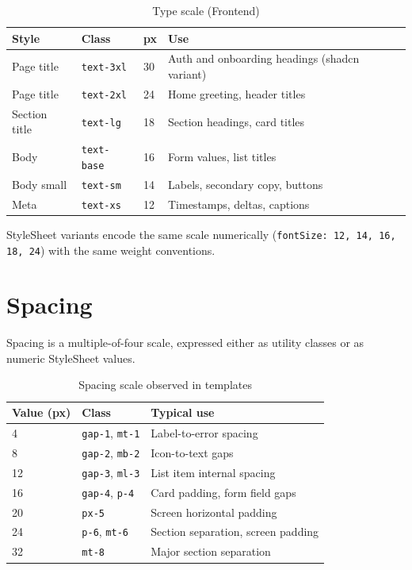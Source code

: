 \begin{table}[H]
\centering
\caption{Type scale (Frontend)}
\begin{tabular}{p{3.2cm}p{2.2cm}p{2.2cm}p{6.2cm}}
\toprule
\textbf{Style} & \textbf{Class} & \textbf{px} & \textbf{Use} \\
\midrule
Page title & \texttt{text-3xl} & 30 & Auth and onboarding headings (shadcn variant) \\
Page title & \texttt{text-2xl} & 24 & Home greeting, header titles \\
Section title & \texttt{text-lg} & 18 & Section headings, card titles \\
Body & \texttt{text-base} & 16 & Form values, list titles \\
Body small & \texttt{text-sm} & 14 & Labels, secondary copy, buttons \\
Meta & \texttt{text-xs} & 12 & Timestamps, deltas, captions \\
\bottomrule
\end{tabular}
\end{table}

StyleSheet variants encode the same scale numerically (\texttt{fontSize: 12, 14,
16, 18, 24}) with the same weight conventions.

\section{Spacing}

Spacing is a multiple-of-four scale, expressed either as utility classes or as
numeric StyleSheet values.

\begin{table}[H]
\centering
\caption{Spacing scale observed in templates}
\begin{tabular}{p{3cm}p{2.6cm}p{8.2cm}}
\toprule
\textbf{Value (px)} & \textbf{Class} & \textbf{Typical use} \\
\midrule
4 & \texttt{gap-1}, \texttt{mt-1} & Label-to-error spacing \\
8 & \texttt{gap-2}, \texttt{mb-2} & Icon-to-text gaps \\
12 & \texttt{gap-3}, \texttt{ml-3} & List item internal spacing \\
16 & \texttt{gap-4}, \texttt{p-4} & Card padding, form field gaps \\
20 & \texttt{px-5} & Screen horizontal padding \\
24 & \texttt{p-6}, \texttt{mt-6} & Section separation, screen padding \\
32 & \texttt{mt-8} & Major section separation \\
\bottomrule
\end{tabular}
\end{table}

